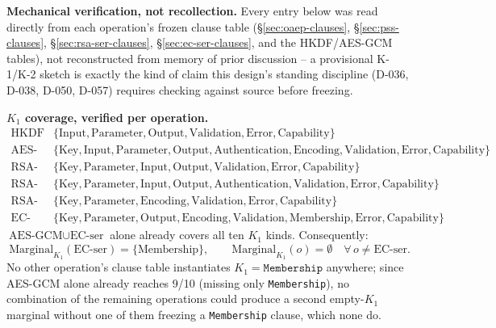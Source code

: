 \documentclass[11pt,a4paper]{article}
\begin{document}
\textbf{Mechanical verification, not recollection.} Every entry below was read directly from each operation's frozen clause table (\S\ref{sec:oaep-clauses}, \S\ref{sec:pss-clauses}, \S\ref{sec:rsa-ser-clauses}, \S\ref{sec:ec-ser-clauses}, and the HKDF/AES-GCM tables), not reconstructed from memory of prior discussion -- a provisional K-1/K-2 sketch is exactly the kind of claim this design's standing discipline (D-036, D-038, D-050, D-057) requires checking against source before freezing.

\textbf{$K_1$ coverage, verified per operation.}
\[
\begin{array}{ll}
\text{HKDF} & \{\text{Input},\text{Parameter},\text{Output},\text{Validation},\text{Error},\text{Capability}\} \\
\text{AES-GCM} & \{\text{Key},\text{Input},\text{Parameter},\text{Output},\text{Authentication},\text{Encoding},\text{Validation},\text{Error},\text{Capability}\} \\
\text{RSA-OAEP} & \{\text{Key},\text{Parameter},\text{Input},\text{Output},\text{Validation},\text{Error},\text{Capability}\} \\
\text{RSA-PSS} & \{\text{Key},\text{Parameter},\text{Input},\text{Output},\text{Authentication},\text{Validation},\text{Error},\text{Capability}\} \\
\text{RSA-ser} & \{\text{Key},\text{Parameter},\text{Encoding},\text{Validation},\text{Error},\text{Capability}\} \\
\text{EC-ser} & \{\text{Key},\text{Parameter},\text{Output},\text{Encoding},\text{Validation},\text{Membership},\text{Error},\text{Capability}\}
\end{array}
\]
$\text{AES-GCM} \cup \text{EC-ser}$ alone already covers all ten $K_1$ kinds. Consequently:
\[
\text{Marginal}_{K_1}(\text{EC-ser}) = \{\text{Membership}\}, \qquad \text{Marginal}_{K_1}(o) = \emptyset \quad \forall\, o \neq \text{EC-ser}.
\]
No other operation's clause table instantiates $K_1=\texttt{Membership}$ anywhere; since AES-GCM alone already reaches 9/10 (missing only \texttt{Membership}), no combination of the remaining operations could produce a second empty-$K_1$ marginal without one of them freezing a \texttt{Membership} clause, which none do.
\end{document}
